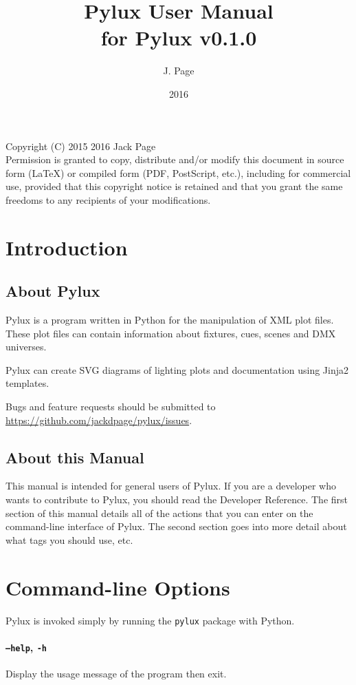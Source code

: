 \documentclass[a4paper]{article}
\begin{document}
\title{Pylux User Manual \\ \large{for Pylux v0.1.0}}
\author{J. Page}
\date{2016}
\maketitle
\vspace{1.0pt}
Copyright (C)  2015 2016 Jack Page \\
Permission is granted to copy, distribute and/or modify this document
in source form (LaTeX) or compiled form (PDF, PostScript, etc.), including 
for commercial use, provided that this copyright notice is retained and that 
you grant the same freedoms to any recipients of your modifications.
\tableofcontents
\newpage
\section{Introduction}
\subsection{About Pylux}
Pylux is a program written in Python for the manipulation of XML plot files. 
These plot files can contain information about fixtures, cues, scenes and DMX 
universes. 

Pylux can create SVG diagrams of lighting plots and documentation using 
Jinja2 templates.

Bugs and feature requests should be submitted to 
\url{https://github.com/jackdpage/pylux/issues}.

\subsection{About this Manual}
This manual is intended for general users of Pylux. If you are a developer 
who wants to contribute to Pylux, you should read the Developer Reference. 
The first section of this manual details all of the actions that you can enter 
on the command-line interface of Pylux. The second section goes into more 
detail about what tags you should use, etc.

\section{Command-line Options}
Pylux is invoked simply by running the \texttt{pylux} package with Python. 

\paragraph{\texttt{--help}, \texttt{-h}}
Display the usage message of the program then exit.
\end{document}
